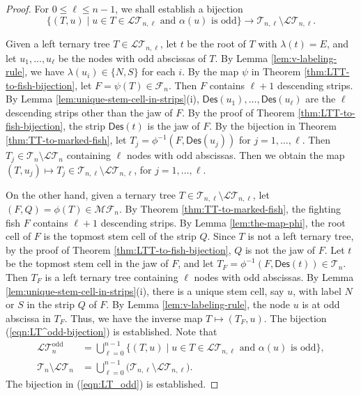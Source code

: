 \documentclass[a4paper,11pt,reqno]{amsart}
\theoremstyle{definition}
\numberwithin{equation}{section}
\newcommand{\Des}{{\textsf{Des}}}
\newcommand{\MF}{{\mathcal{MF}}}
\newcommand{\LT}{{\mathcal{LT}}}
\newcommand{\F}{{\mathcal{F}}}
\newcommand{\T}{{\mathcal{T}}}
\newcommand{\odd}{{\textrm{odd}}}
\begin{document}
\begin{proof}
For $0\le \ell\le n-1$, we shall establish a bijection
\begin{equation} \label{eqn:LT^odd-bijection}
\{(T,u)\mid u\in T\in\LT_{n,\ell}\mbox{ and $\alpha(u)$ is odd}\}\rightarrow\T_{n,\ell}\setminus\LT_{n,\ell}.
\end{equation}

Given a left ternary tree $T\in\LT_{n,\ell}$, let $t$ be the root of $T$ with $\lambda(t)=E$, and let $u_1,\dots,u_{\ell}$ be the nodes with odd abscissas of $T$.  By Lemma \ref{lem:v-labeling-rule}, we have $\lambda(u_i)\in\{N,S\}$ for each $i$. By the map $\psi$ in Theorem \ref{thm:LTT-to-fish-bijection}, let $F=\psi(T)\in\F_n$.  Then $F$ contains $\ell+1$ descending strips. By Lemma \ref{lem:unique-stem-cell-in-strips}(i), $\Des(u_1),\dots,\Des(u_{\ell})$ are the $\ell$ descending strips other than the jaw of $F$. By the proof of Theorem \ref{thm:LTT-to-fish-bijection}, the strip $\Des(t)$ is the jaw of $F$.
By the bijection in Theorem \ref{thm:TT-to-marked-fish}, let $T_j=\phi^{-1}(F,\Des(u_j))$ for $j=1,\dots, \ell$. Then $T_j\in\T_n\setminus\LT_n$ containing $\ell$ nodes with odd abscissas. Then we obtain the map $(T,u_j)\mapsto T_j\in\T_{n,\ell}\setminus\LT_{n,\ell}$, for $j=1,\dots, \ell$.

On the other hand, given a ternary tree $T\in\T_{n,\ell}\setminus\LT_{n,\ell}$, let $(F,Q)=\phi(T)\in\MF_n$. By Theorem \ref{thm:TT-to-marked-fish}, the fighting fish $F$ contains $\ell+1$ descending strips. By Lemma \ref{lem:the-map-phi}, the root cell of $F$ is the topmost stem cell of the strip $Q$. Since $T$ is not a left ternary tree, by the proof of Theorem \ref{thm:LTT-to-fish-bijection}, $Q$ is not the jaw of $F$. Let $t$ be the topmost stem cell in the jaw of $F$, and let $T_F=\phi^{-1}(F,\Des(t))\in\T_n$. Then $T_F$ is a left ternary tree containing $\ell$ nodes with odd abscissas. By Lemma \ref{lem:unique-stem-cell-in-strips}(i), there is a unique stem cell, say $u$, with label $N$ or $S$ in the strip $Q$ of $F$. By Lemma \ref{lem:v-labeling-rule}, the node $u$ is at odd abscissa in $T_F$. Thus, we have the inverse map $T\mapsto (T_F,u)$. The bijection (\ref{eqn:LT^odd-bijection}) is established. Note that 
\begin{align*}
\LT_n^{\odd} &= \bigcup_{\ell=0}^{n-1} 
\{(T,u)\mid u\in T\in\LT_{n,\ell}\mbox{ and $\alpha(u)$ is odd}\}, \\
\T_n\setminus \LT_n &= \bigcup_{\ell=0}^{n-1} \big(\T_{n,\ell} \setminus\LT_{n,\ell}\big).
\end{align*}
The bijection in (\ref{eqn:LT_odd}) is established.


\end{proof}
\end{document}
